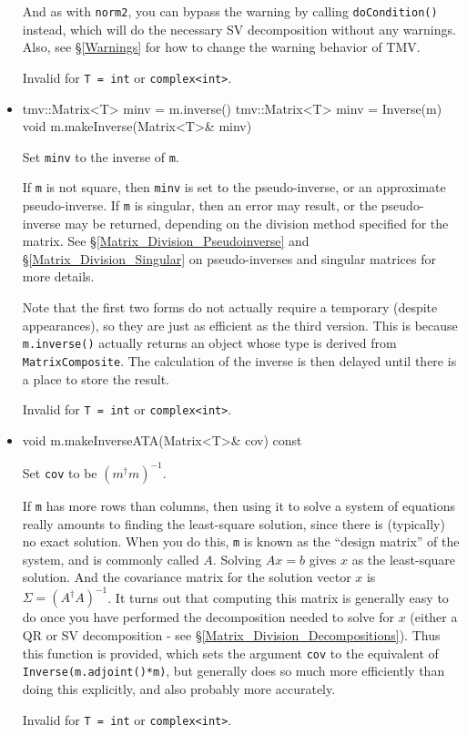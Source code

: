\documentclass[twoside,letterpaper,11pt]{article}
\renewcommand{\tt}[1]{{\lstinline {#1}}}
\begin{document}
\begin{itemize}
And as with \tt{norm2}, you can bypass the warning by calling \tt{doCondition()} instead,
which will do the necessary SV decomposition without any warnings.  
Also, see \S\ref{Warnings} for how to change the warning behavior of TMV.

Invalid for \tt{T = int} or \tt{complex<int>}.

\item
\begin{tmvcode}
tmv::Matrix<T> minv = m.inverse()
tmv::Matrix<T> minv = Inverse(m)
void m.makeInverse(Matrix<T>& minv)
\end{tmvcode}
Set \tt{minv} to the inverse of \tt{m}.    

If \tt{m} is not square, then \tt{minv} is set to the pseudo-inverse, or an approximate
pseudo-inverse.  If \tt{m} is singular, then an error may result, or the pseudo-inverse
may be returned, depending on the division method specified for the matrix.  
See \S\ref{Matrix_Division_Pseudoinverse} and \S\ref{Matrix_Division_Singular} 
on pseudo-inverses and singular matrices for more details.

Note that the first two forms do not actually require a 
temporary (despite appearances), so they are just as efficient as the third version.
This is because \tt{m.inverse()} actually returns an object whose type is derived from
\tt{MatrixComposite}.  The calculation of the inverse is then delayed 
until there is a place to store the result.

Invalid for \tt{T = int} or \tt{complex<int>}.

\item
\begin{tmvcode}
void m.makeInverseATA(Matrix<T>& cov) const
\end{tmvcode}
Set \tt{cov} to be $(m^\dagger m)^{-1}$.  

If \tt{m} has more rows than columns, then using it to solve a system of equations
really amounts to finding the least-square solution, since there is (typically) no
exact solution.  When you do this, \tt{m} is known as the ``design matrix'' of the system,
and is commonly called $A$.  Solving $A x=b$ gives $x$ as the least-square 
solution.  And the covariance matrix for the solution vector $x$ is 
$\Sigma = (A^\dagger A)^{-1}$.
It turns out that computing this matrix is generally easy to do once you have 
performed the decomposition needed to solve for $x$ (either a QR or SV 
decomposition - see \S\ref{Matrix_Division_Decompositions}).  
Thus this function is provided, which sets the
argument \tt{cov} to the equivalent of \tt{Inverse(m.adjoint()*m)}, 
but generally does so much more efficiently than doing this explicitly, 
and also probably more accurately.

Invalid for \tt{T = int} or \tt{complex<int>}.

\end{itemize}
\end{document}

